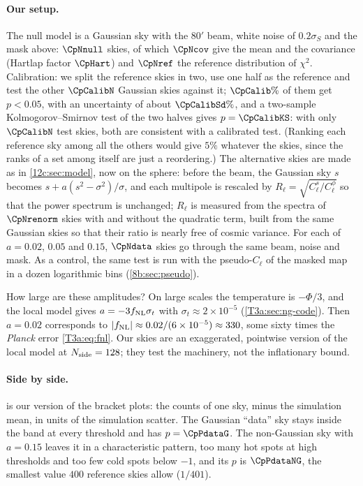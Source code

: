\paragraph{Our setup.} The null model is a Gaussian sky with the $80'$ beam, white noise of $0.2\sigma_S$ and the mask above: $\CpNnull$
skies, of which $\CpNcov$ give the mean and the covariance (Hartlap factor $\CpHart$) and $\CpNref$ the reference distribution of $\chi^2$.
Calibration: we split the reference skies in two, use one half as the reference and test the other $\CpCalibN$ Gaussian skies
against it; $\CpCalib\%$ of them get $p<0.05$, with an uncertainty of about $\CpCalibSd\%$, and a two-sample
Kolmogorov--Smirnov test of the two halves gives $p=\CpCalibKS$: with only $\CpCalibN$ test skies, both are consistent
with a calibrated test. (Ranking each reference sky among all the others would give
$5\%$ whatever the skies, since the ranks of a set among itself are just a reordering.) The alternative
skies are made as in \cref{12c:sec:model}, now on the sphere: before the beam, the Gaussian sky $s$ becomes $s+a(s^2-\sigma^2)/\sigma$, and each
multipole is rescaled by $R_\ell=\sqrt{C_\ell^{s}/C_\ell^{\phi}}$ so that the power spectrum is unchanged; $R_\ell$ is measured from the
spectra of $\CpNrenorm$ skies with and without the quadratic term, built from the same Gaussian skies so that their ratio is nearly free of
cosmic variance. For each of $a=0.02$, $0.05$ and $0.15$, $\CpNdata$ skies go through the same beam, noise and mask. As a control, the same
test is run with the pseudo-$C_\ell$ of the masked map in a dozen logarithmic bins (\cref{8b:sec:pseudo}).

How large are these amplitudes? On large scales the temperature is $-\Phi/3$, and the local model gives $a=-3f_{\rm NL}\sigma_t$ with
$\sigma_t\approx2\times10^{-5}$ (\cref{T3a:sec:ng-code}). Then $a=0.02$ corresponds to $|f_{\rm NL}|\approx0.02/(6\times10^{-5})\approx330$,
some sixty times the \textit{Planck} error \eqref{T3a:eq:fnl}. Our skies are an exaggerated, pointwise version of the local model at
$N_{\rm side}=128$; they test the machinery, not the inflationary bound.

\paragraph{Side by side.}  is our version of the bracket plots: the counts of one sky, minus the simulation mean,
in units of the simulation scatter. The Gaussian ``data'' sky stays inside the band at every threshold and has $p=\CpPdataG$. The
non-Gaussian sky with $a=0.15$ leaves it in a characteristic pattern, too many hot spots at high thresholds and too few cold spots below $-1$,
and its $p$ is $\CpPdataNG$, the smallest value $400$ reference skies allow ($1/401$).

